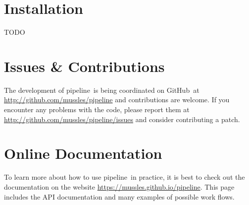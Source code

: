 \documentclass[12pt,preprint]{aastex}
\newcommand{\project}[1]{{\sffamily #1}}
\newcommand{\numpy}{\project{numpy}}
\newcommand{\github}{\project{GitHub}}
\newcommand{\thisplain}{pipeline}
\newcommand{\this}{\project{\thisplain}}
\newcommand{\sectlabel}[1]{\label{sect:#1}}
\begin{document}
\clearpage
\appendix
\section{Installation}\sectlabel{install}

TODO


\section{Issues \& Contributions}

The development of \this\ is being coordinated on \github\ at
\url{http://github.com/mussles/pipeline} and contributions are welcome. If you
encounter any problems with the code, please report them at
\url{http://github.com/mussles/pipeline/issues} and consider
contributing a patch.

\section{Online Documentation}

To learn more about how to use \this\ in practice, it is best to check out the
documentation on the website \url{https://mussles.github.io/pipeline}. This page includes
the API documentation and many examples of possible work flows.
\end{document}
